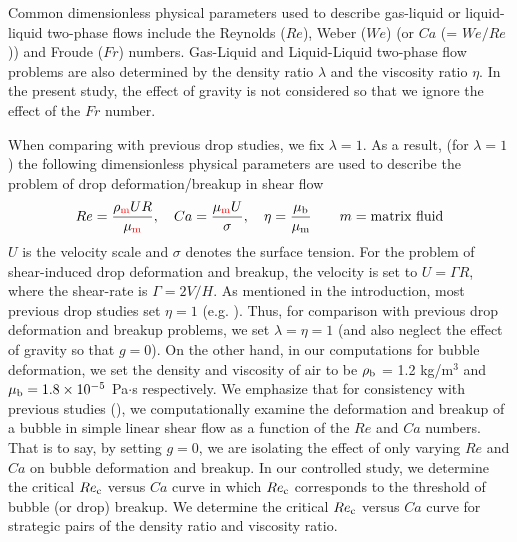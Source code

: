 \documentclass[%
 reprint,
 showkeys,
 amsmath,amssymb,
 aps,
 prfluids,
 onecolumn
]{revtex4-2}
\begin{document}
Common dimensionless physical parameters used to describe gas-liquid or
liquid-liquid two-phase flows include the Reynolds ($Re$), Weber ($We$) (or
$Ca$ (= $We/Re$)) and Froude ($Fr$) numbers.  Gas-Liquid and 
Liquid-Liquid two-phase flow problems are also determined by the
density ratio $\lambda$ and the viscosity ratio $\eta$.  
In the present study, the effect of gravity is not considered so
that we ignore the effect of the $Fr$ number.

When comparing with previous drop studies, we fix $\lambda=1$.  As a result,
(for $\lambda=1$) the following dimensionless physical parameters are used to
describe the problem of drop deformation/breakup in shear flow
%
\begin{eqnarray}\label{dimensonless}
  Re = \frac{\rho_{\rm {\color{red}m}}UR}{\mu_{\rm {\color{red}m}}}, \quad
  Ca = \frac{\mu_{\rm {\color{red}m}}U}{\sigma}, \quad
  \eta = \frac{\mu_{\rm b}}{\mu_{\rm m}} 
	\hspace{20pt} m=\mbox{matrix fluid}
\end{eqnarray}
%
$U$ is the velocity scale and $\sigma$ denotes the surface tension.  For the
problem of shear-induced drop deformation and breakup, the velocity is set to
$U = \mathit{\Gamma} R$, where the shear-rate is $\mathit{\Gamma} = 2V/H$.  As
mentioned in the introduction, most previous drop studies set $\eta =
1$ (e.g. \cite{LiRenRen00}).  
Thus, for comparison with previous drop deformation and breakup
problems, we set $\lambda = \eta = 1$ (and also neglect the effect of gravity
so that $g=0$). On the other hand, in our computations for bubble deformation,
we set the density and viscosity of air to be $\rho_{\rm b}$ = 1.2 kg/m$^{3}$
and $\mu_{\rm b} = 1.8 \times 10^{-5}$ Pa$\cdot$s respectively.  We emphasize
that for consistency with previous studies (\cite{LiRenRen00, RusMan02,
MulTobDreFisWin08, KomShaEskDer14, AmaBalCasOli19}), 
we computationally examine the deformation and breakup of a bubble in simple
linear shear flow as a function of the $Re$ and $Ca$ numbers.  {\color{red}
That is to say, by setting $g=0$, we are isolating the effect of only varying
$Re$ and $Ca$ on bubble deformation and breakup.  In our controlled study, we
determine the critical $Re_{\rm c}$ versus $Ca$ curve in which $Re_{\rm c}$
corresponds to the threshold of bubble (or drop) breakup.  We determine the
critical $Re_{\rm c}$ versus $Ca$ curve for strategic pairs of the density
ratio and viscosity ratio. }
\end{document}
